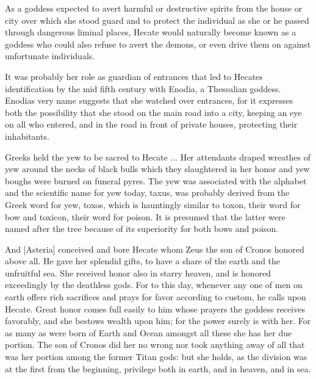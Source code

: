 \begin{tcolorbox}[breakable, colback=white, colframe=black!80,
  boxrule=0.6pt, arc=0mm, left=3mm, right=3mm, top=2mm, bottom=2mm]
\medskip
As a goddess expected to avert harmful or destructive spirits from the house or city over which she stood guard and to protect the individual as she or he passed through dangerous liminal places, Hecate would naturally become known as a goddess who could also refuse to avert the demons, or even drive them on against unfortunate individuals.\par
\medskip
It was probably her role as guardian of entrances that led to Hecate\textquotesingle{}s identification by the mid fifth century with Enodia, a Thessalian goddess. Enodia\textquotesingle{}s very name suggests that she watched over entrances, for it expresses both the possibility that she stood on the main road into a city, keeping an eye on all who entered, and in the road in front of private houses, protecting their inhabitants.\par
\medskip
Greeks held the yew to be sacred to Hecate ... Her attendants draped wreathes of yew around the necks of black bulls which they slaughtered in her honor and yew boughs were burned on funeral pyres. The yew was associated with the alphabet and the scientific name for yew today, taxus, was probably derived from the Greek word for yew, toxos, which is hauntingly similar to toxon, their word for bow and toxicon, their word for poison. It is presumed that the latter were named after the tree because of its superiority for both bows and poison.\par
\medskip
And [Asteria] conceived and bore Hecate whom Zeus the son of Cronos honored above all. He gave her splendid gifts, to have a share of the earth and the unfruitful sea. She received honor also in starry heaven, and is honored exceedingly by the deathless gods. For to this day, whenever any one of men on earth offers rich sacrifices and prays for favor according to custom, he calls upon Hecate. Great honor comes full easily to him whose prayers the goddess receives favorably, and she bestows wealth upon him; for the power surely is with her. For as many as were born of Earth and Ocean amongst all these she has her due portion. The son of Cronos did her no wrong nor took anything away of all that was her portion among the former Titan gods: but she holds, as the division was at the first from the beginning, privilege both in earth, and in heaven, and in sea.\par
\medskip

\end{tcolorbox}
